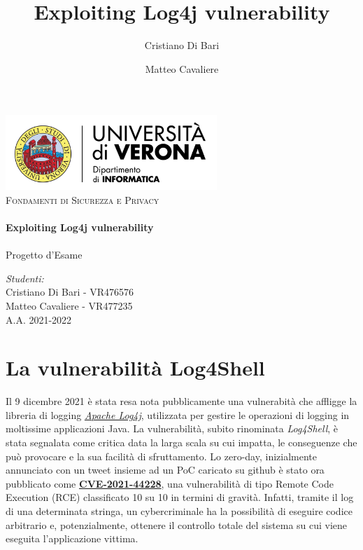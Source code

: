 \documentclass[a4paper, 12pt]{article}
\title{Exploiting Log4j vulnerability}
\author{Cristiano Di Bari}
\author{Matteo Cavaliere}
\begin{document}
\begin{titlepage}
    \vbox{ }

    \begin{center}
        \includegraphics[width=0.60\textwidth]{img/univr-di-logo.png}\\[2cm]
        \textsc{\Large Fondamenti di Sicurezza e Privacy}\\[0.6cm]

        \noindent\makebox[\linewidth]{\rule{.7\paperwidth}{.6pt}}\\[0.7cm]
        { \huge \bfseries Exploiting Log4j vulnerability}\\[0.25cm]
        \noindent\makebox[\linewidth]{\rule{.7\paperwidth}{.6pt}}\\[0.7cm]
        \large{Progetto d'Esame}\\[1.2cm]
        \vfill
        \large
        
        \emph{Studenti:}\\[1mm]
        Cristiano Di Bari  - VR476576  \\[1mm]
        Matteo Cavaliere - VR477235  \\[2cm]

        {\large A.A. 2021-2022}
    \end{center}
\end{titlepage}

\tableofcontents
\newpage

\section{La vulnerabilità Log4Shell}
Il 9 dicembre 2021 è stata resa nota pubblicamente una vulnerabità che affligge la libreria di logging \emph{\href{https://logging.apache.org/log4j/2.x/}{Apache Log4j}}, utilizzata per gestire le operazioni di logging in moltissime applicazioni Java.
La vulnerabilità, subito rinominata \emph{Log4Shell}, è stata segnalata come critica data la larga scala su cui impatta, le conseguenze che può provocare e la sua facilità di sfruttamento.
Lo zero-day, inizialmente annunciato con un tweet insieme ad un PoC caricato su github è stato ora pubblicato come \textbf{\href{https://nvd.nist.gov/vuln/detail/CVE-2021-44228}{CVE-2021-44228}},  una vulnerabilità di tipo Remote Code Execution (RCE) classificato 10 su 10 in termini di gravità. Infatti, tramite il log di una determinata stringa, un cybercriminale ha la possibilità di eseguire codice arbitrario e, potenzialmente, ottenere il controllo totale del sistema su cui viene eseguita l'applicazione vittima.
\end{document}
